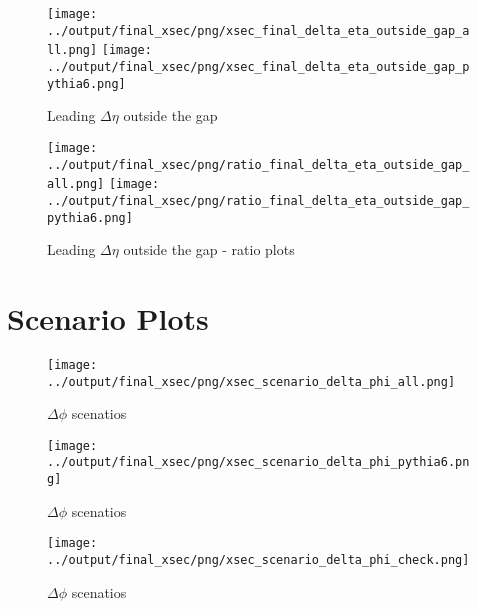 \documentclass[11pt]{article}
\begin{document}
\begin{figure}[ht]
\centering
\texttt{[image: ../output/final\_xsec/png/xsec\_final\_delta\_eta\_outside\_gap\_all.png]}
\texttt{[image: ../output/final\_xsec/png/xsec\_final\_delta\_eta\_outside\_gap\_pythia6.png]}
\caption{Leading $\Delta\eta$ outside the gap}
\label{fig:leading_delta_eta_outside_gap}
\end{figure}

\begin{figure}[ht]
\centering
\texttt{[image: ../output/final\_xsec/png/ratio\_final\_delta\_eta\_outside\_gap\_all.png]}
\texttt{[image: ../output/final\_xsec/png/ratio\_final\_delta\_eta\_outside\_gap\_pythia6.png]}
\caption{Leading $\Delta\eta$ outside the gap - ratio plots}
\label{fig:leading_delta_eta_outside_gap_ratio}
\end{figure}

\clearpage
\section{Scenario Plots}

\begin{figure}[ht]
\centering
\texttt{[image: ../output/final\_xsec/png/xsec\_scenario\_delta\_phi\_all.png]}
\caption{$\Delta\phi$ scenatios}
\label{fig:leading_delta_phi_scenarios_all}
\end{figure}

\begin{figure}[ht]
\centering
\texttt{[image: ../output/final\_xsec/png/xsec\_scenario\_delta\_phi\_pythia6.png]}
\caption{$\Delta\phi$ scenatios}
\label{fig:leading_delta_phi_scenarios_pythia6}
\end{figure}

\begin{figure}[ht]
\centering
\texttt{[image: ../output/final\_xsec/png/xsec\_scenario\_delta\_phi\_check.png]}
\caption{$\Delta\phi$ scenatios}
\label{fig:leading_delta_phi_scenarios_check}
\end{figure}

 
\end{document}
